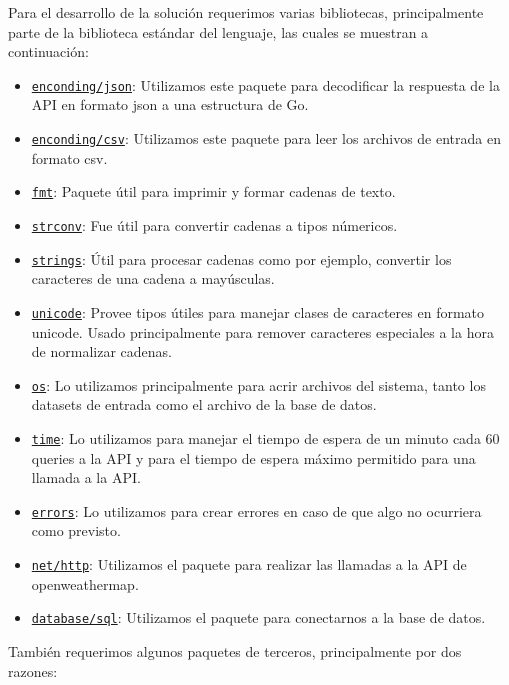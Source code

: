 \documentclass{report}
\begin{document}
\begin{itemize}
    Para el desarrollo de la solución requerimos varias bibliotecas, principalmente parte de la biblioteca estándar del lenguaje, las cuales se muestran a continuación:
    \begin{itemize}
        \item \href{https://golang.org/pkg/encoding/json/}{\texttt{enconding/json}}: Utilizamos este paquete para decodificar la respuesta de la API en formato json a una estructura de Go.
        \item \href{https://golang.org/pkg/encoding/csv/}{\texttt{enconding/csv}}: Utilizamos este paquete para leer los archivos de entrada en formato csv.
        \item \href{https://golang.org/pkg/fmt/}{\texttt{fmt}}: Paquete útil para imprimir y formar cadenas de texto.
        \item \href{https://golang.org/pkg/strconv/}{\texttt{strconv}}: Fue útil para convertir cadenas a tipos númericos.
        \item \href{https://golang.org/pkg/strings/}{\texttt{strings}}: Útil para procesar cadenas como por ejemplo, convertir los caracteres  de una cadena a mayúsculas.
        \item \href{https://golang.org/pkg/unicode/}{\texttt{unicode}}: Provee tipos útiles para manejar clases de caracteres en formato unicode. Usado principalmente para remover caracteres especiales a la hora de normalizar cadenas.
        \item \href{https://golang.org/pkg/os/}{\texttt{os}}: Lo utilizamos principalmente para acrir archivos del sistema, tanto los datasets de entrada como el archivo de la base de datos.
        \item \href{https://golang.org/pkg/time/}{\texttt{time}}: Lo utilizamos para manejar el tiempo de espera de un minuto cada 60 queries a la API y para el tiempo de espera máximo permitido para una llamada a la API.
        \item \href{https://golang.org/pkg/errors/}{\texttt{errors}}: Lo utilizamos para crear errores en caso de que algo no ocurriera como previsto.
        \item \href{https://golang.org/pkg/net/http/}{\texttt{net/http}}: Utilizamos el paquete para realizar las llamadas a la API de openweathermap.
        \item \href{https://golang.org/pkg/database/sql/}{\texttt{database/sql}}: Utilizamos el paquete para conectarnos a la base de datos.
    \end{itemize}
    También requerimos algunos paquetes de terceros, principalmente por dos razones:

\end{itemize}
\end{document}
